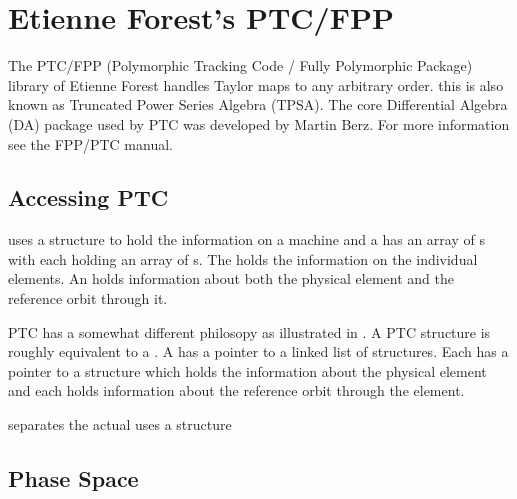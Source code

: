 \chapter{Etienne Forest's PTC/FPP}
\label{c:ptc}

The PTC/FPP (Polymorphic Tracking Code / Fully Polymorphic Package)
library of Etienne Forest handles Taylor maps to any arbitrary
order. this is also known as Truncated Power Series Algebra
(TPSA). The core Differential Algebra (DA) package used by PTC was
developed by Martin Berz\cite{b:berz}.  For more information see the
FPP/PTC manual\cite{b:ptc}. 

\section{Accessing PTC}
\label{s:ptc.structures}

\bmad uses a  structure to hold the information on a
machine and a  has an array of s with
each  holding an array of s. The
 holds the information on the individual elements. An
 holds information about both the physical element and
the reference orbit through it.

PTC has a somewhat different philosopy as illustrated in
. A PTC  structure is roughly equivalent
to a \bmad {}. A  has a pointer to a linked
list of  structures. Each  has a pointer to a
 structure which holds the information about the physical
element and each  holds information about the reference
orbit through the element.

separates the actual uses
a  structure

\section{Phase Space}
\label{s:ptc.space}

